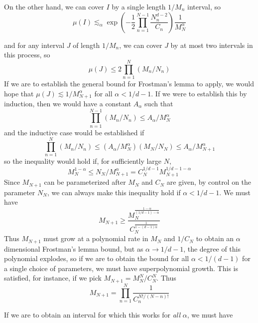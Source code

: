\documentclass{report}
\theoremstyle{plain}
\theoremstyle{plain}
\begin{document}
%
On the other hand, we can cover $I$ by a single length $1/M_n$ interval, so
%
\[ \mu(I) \lesssim_\alpha \exp \left( - \frac{1}{2} \prod_{n = 1}^{N-1} \frac{N_n^{d-2}}{C_n} \right) \frac{1}{M_N^\alpha} \]

and for any interval $J$ of length $1/M_n$, we can cover $J$ by at most two intervals in this process, so
%
\[ \mu(J) \leq 2 \prod_{n = 1}^N (M_n/N_n) \]
%
If we are to establish the general bound for Frostman's lemma to apply, we would hope that $\mu(J) \lesssim 1/M_{N+1}^\alpha$ for all $\alpha < 1/d-1$. If we were to establish this by induction, then we would have a constant $A_\alpha$ such that
%
\[ \prod_{n = 1}^{N-1} (M_n/N_n) \leq A_\alpha/M_N^\alpha \]
%
and the inductive case would be established if
%
\[ \prod_{n = 1}^N (M_n/N_n) \leq (A_\alpha/M_N^\alpha)(M_N/N_N) \leq A_\alpha/M_{N+1}^\alpha \]
%
so the inequality would hold if, for sufficiently large $N$,
%
\[ M_N^{1-\alpha} \leq N_N/M_{N+1}^\alpha = C_N^{1/d-1} M_{N+1}^{1/d-1 - \alpha} \]
%
Since $M_{N+1}$ can be parameterized after $M_N$ and $C_N$ are given, by control on the parameter $N_N$, we can always make this inequality hold if $\alpha < 1/d-1$. We must have
%
\[ M_{N+1} \geq \frac{M_N^{\frac{1 - \alpha}{(1/d-1) - \alpha}}}{C_N^{\frac{1}{1 - (d-1)\alpha}}} \]
%
Thus $M_{N+1}$ must grow at a polynomial rate in $M_N$ and $1/C_N$ to obtain an $\alpha$ dimensional Frostman's lemma bound, but as $\alpha \to 1/d-1$, the degree of this polynomial explodes, so if we are to obtain the bound for all $\alpha < 1/(d-1)$ for a single choice of parameters, we must have superpolynomial growth. This is satisfied, for instance, if we pick $M_{N+1} = M_N^N/C_N^N$. Thus
%
\[ M_{N+1} = \prod_{n = 1}^N \frac{1}{C_n^{N!/(N-n)!}} \]

If we are to obtain an interval for which this works for {\it all} $\alpha$, we must have
\end{document}
